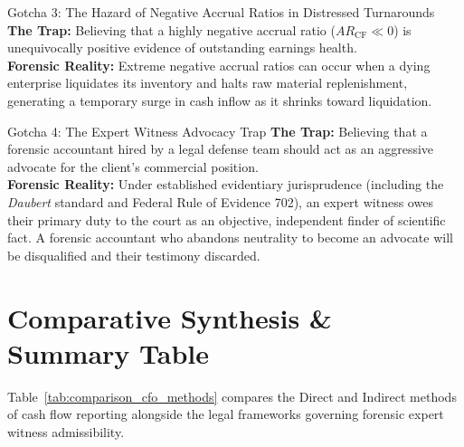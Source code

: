 \begin{trapbox}{Gotcha 3: The Hazard of Negative Accrual Ratios in Distressed Turnarounds}
\textbf{The Trap:} Believing that a highly negative accrual ratio ($AR_{\text{CF}} \ll 0$) is unequivocally positive evidence of outstanding earnings health.\\
\textbf{Forensic Reality:} Extreme negative accrual ratios can occur when a dying enterprise liquidates its inventory and halts raw material replenishment, generating a temporary surge in cash inflow as it shrinks toward liquidation.
\end{trapbox}

\begin{trapbox}{Gotcha 4: The Expert Witness Advocacy Trap}
\textbf{The Trap:} Believing that a forensic accountant hired by a legal defense team should act as an aggressive advocate for the client's commercial position.\\
\textbf{Forensic Reality:} Under established evidentiary jurisprudence (including the \textit{Daubert} standard and Federal Rule of Evidence 702), an expert witness owes their primary duty to the court as an objective, independent finder of scientific fact. A forensic accountant who abandons neutrality to become an advocate will be disqualified and their testimony discarded.
\end{trapbox}

\section{Comparative Synthesis \& Summary Table}

Table~\ref{tab:comparison_cfo_methods} compares the Direct and Indirect methods of cash flow reporting alongside the legal frameworks governing forensic expert witness admissibility.

